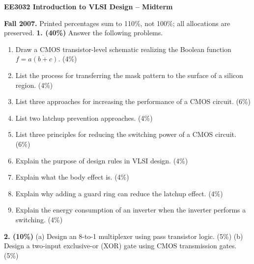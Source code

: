 \documentclass[10pt]{article}
\begin{document}
\begin{center}{\large\bfseries EE3032 Introduction to VLSI Design -- Midterm}\end{center}
\textbf{Fall 2007.} Printed percentages sum to 110\%, not 100\%; all allocations are preserved.
\textbf{1. (40\%)} Answer the following problems.
\begin{enumerate}[label=(\alph*),leftmargin=7mm,itemsep=1pt]
\item Draw a CMOS transistor-level schematic realizing the Boolean function $f=\overline{a(b+c)}$. (4\%)
\item List the process for transferring the mask pattern to the surface of a silicon region. (4\%)
\item List three approaches for increasing the performance of a CMOS circuit. (6\%)
\item List two latchup prevention approaches. (4\%)
\item List three principles for reducing the switching power of a CMOS circuit. (6\%)
\item Explain the purpose of design rules in VLSI design. (4\%)
\item Explain what the body effect is. (4\%)
\item Explain why adding a guard ring can reduce the latchup effect. (4\%)
\item Explain the energy consumption of an inverter when the inverter performs a switching. (4\%)
\end{enumerate}

\textbf{2. (10\%)} (a) Design an 8-to-1 multiplexer using pass transistor logic. (5\%) (b) Design a two-input exclusive-or (XOR) gate using CMOS transmission gates. (5\%)
\end{document}
